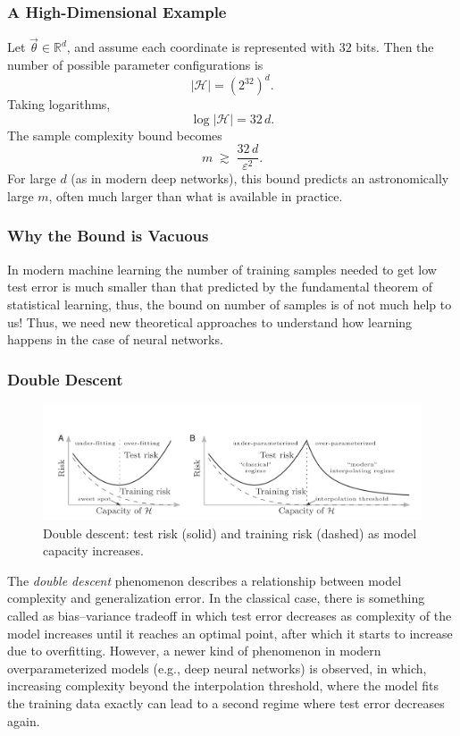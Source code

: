 \documentclass[11pt]{article}
\theoremstyle{plain}
\begin{document}
\subsubsection*{A High-Dimensional Example}
Let $\vec{\theta} \in \mathbb{R}^d$, and assume each coordinate is represented with $32$ bits. Then the number of possible parameter configurations is
\[
|\mathcal{H}| = \left( 2^{32} \right)^{d}.
\]
Taking logarithms,
\[
\log |\mathcal{H}| = 32\,d.
\]
The sample complexity bound becomes
\[
m \;\gtrsim\; \frac{32\,d}{\varepsilon^2}.
\]
For large $d$ (as in modern deep networks), this bound predicts an astronomically large $m$, often much larger than what is available in practice.

\subsubsection*{Why the Bound is Vacuous}
In modern machine learning the number of training samples needed to get low test error is much smaller than that predicted by the fundamental theorem of statistical learning, thus, the bound on number of samples is of not much help to us! Thus, we need new theoretical approaches to understand how learning happens in the case of neural networks.

\subsubsection{Double Descent}

\begin{figure}[ht]
  \centering
  \includegraphics[width=\linewidth]{DoubleDescent.png}
  \caption{Double descent: test risk (solid) and training risk (dashed) as model capacity increases.}
  \label{fig:double-descent}
\end{figure}

The \textit{double descent} phenomenon describes a relationship between model complexity and generalization error. 
In the classical case, there is something called as bias--variance tradeoff in which test error decreases as complexity of the model increases until it reaches an optimal point, after which it starts to increase due to overfitting.
However, a newer kind of phenomenon in modern overparameterized models (e.g., deep neural networks) is observed, in which, increasing complexity beyond the interpolation threshold, where the model fits the training data exactly can lead to a second regime where test error decreases again. 
\end{document}
